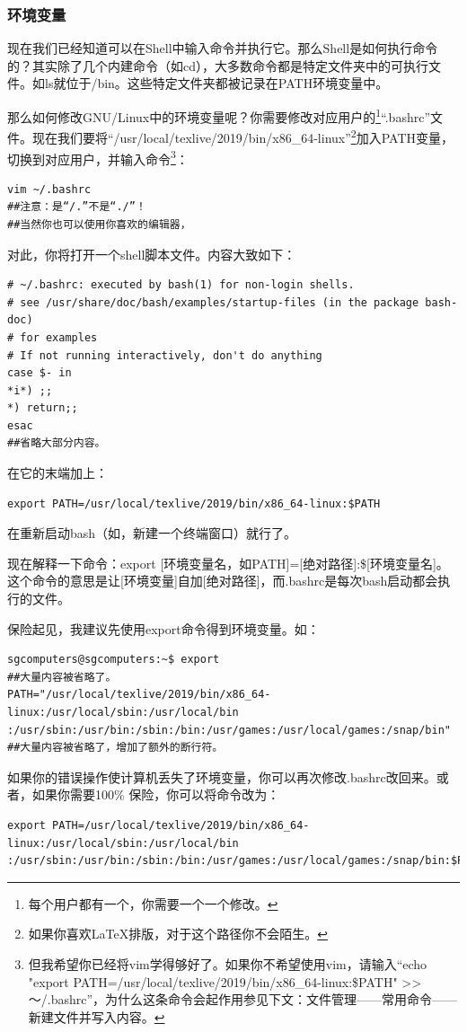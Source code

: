 \documentclass{book}
\begin{document}
\subsubsection{环境变量}
现在我们已经知道可以在Shell中输入命令并执行它。那么Shell是如何执行命令的？其实除了几个内建命令（如cd），大多数命令都是特定文件夹中的可执行文件。如ls就位于/bin。这些特定文件夹都被记录在PATH环境变量中。\par
那么如何修改GNU/Linux中的环境变量呢？你需要修改对应用户的\footnote{每个用户都有一个，你需要一个一个修改。}“.bashrc”文件。现在我们要将“/usr/local/texlive/2019/bin/x86\_64-linux”\footnote{如果你喜欢\LaTeX 排版，对于这个路径你不会陌生。}加入PATH变量，切换到对应用户，并输入命令\footnote{但我希望你已经将vim学得够好了。如果你不希望使用vim，请输入“echo "export PATH=/usr/local/texlive/2019/bin/x86\_64-linux:\$PATH" >> ～/.bashrc”，为什么这条命令会起作用参见下文：文件管理——常用命令——新建文件并写入内容。}：
\begin{verbatim}
vim ~/.bashrc
##注意：是“/.”不是“./”！
##当然你也可以使用你喜欢的编辑器，
\end{verbatim}
对此，你将打开一个shell脚本文件。内容大致如下：
\begin{verbatim}
# ~/.bashrc: executed by bash(1) for non-login shells.
# see /usr/share/doc/bash/examples/startup-files (in the package bash-doc)
# for examples
# If not running interactively, don't do anything
case $- in
*i*) ;;
*) return;;
esac
##省略大部分内容。
\end{verbatim}
在它的末端加上：
\begin{verbatim}
export PATH=/usr/local/texlive/2019/bin/x86_64-linux:$PATH
\end{verbatim}
在重新启动bash（如，新建一个终端窗口）就行了。\par
现在解释一下命令：export [环境变量名，如PATH]=[绝对路径]:\$[环境变量名]。这个命令的意思是让[环境变量]自加[绝对路径]，而.bashrc是每次bash启动都会执行的文件。\par
保险起见，我建议先使用export命令得到环境变量。如：
\begin{verbatim}
sgcomputers@sgcomputers:~$ export
##大量内容被省略了。
PATH="/usr/local/texlive/2019/bin/x86_64-linux:/usr/local/sbin:/usr/local/bin
:/usr/sbin:/usr/bin:/sbin:/bin:/usr/games:/usr/local/games:/snap/bin"
##大量内容被省略了，增加了额外的断行符。
\end{verbatim}
如果你的错误操作使计算机丢失了环境变量，你可以再次修改.bashrc改回来。或者，如果你需要100\% 保险，你可以将命令改为：
\begin{verbatim}
export PATH=/usr/local/texlive/2019/bin/x86_64-linux:/usr/local/sbin:/usr/local/bin
:/usr/sbin:/usr/bin:/sbin:/bin:/usr/games:/usr/local/games:/snap/bin:$PATH
\end{verbatim}
\end{document}
